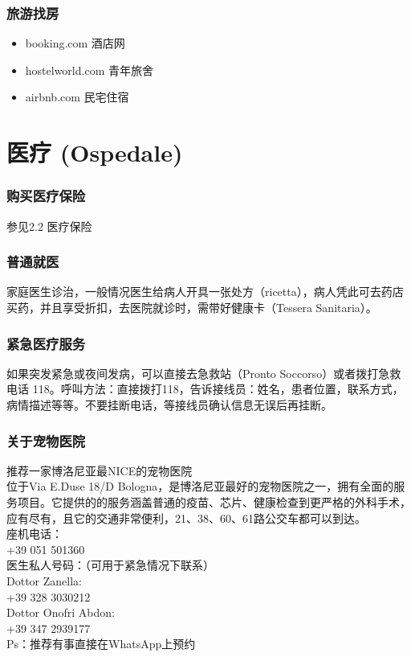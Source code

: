 \subsubsection{旅游找房}
\begin{itemize}
\item booking.com 酒店网
\item hostelworld.com 青年旅舍
\item airbnb.com 民宅住宿
\end{itemize} 


\section{医疗 (Ospedale)}


\subsubsection{购买医疗保险}
参见2.2 医疗保险 

\subsubsection{普通就医}
家庭医生诊治，一般情况医生给病人开具一张处方（ricetta），病人凭此可去药店买药，并且享受折扣，去医院就诊时，需带好健康卡（Tessera Sanitaria）。
\subsubsection{紧急医疗服务}

如果突发紧急或夜间发病，可以直接去急救站（Pronto Soccorso）或者拨打急救电话 118。呼叫方法：直接拨打118，告诉接线员：姓名，患者位置，联系方式，病情描述等等。不要挂断电话，等接线员确认信息无误后再挂断。
\subsubsection{关于宠物医院}
推荐一家博洛尼亚最NICE的宠物医院\\
位于Via E.Duse 18/D Bologna，是博洛尼亚最好的宠物医院之一，拥有全面的服务项目。它提供的的服务涵盖普通的疫苗、芯片、健康检查到更严格的外科手术，应有尽有，且它的交通非常便利，21、38、60、61路公交车都可以到达。\\
座机电话：\\
+39 051 501360\\
医生私人号码：（可用于紧急情况下联系）\\
Dottor Zanella:\\
+39 328 3030212\\
Dottor Onofri Abdon:\\
+39 347 2939177\\
Ps：推荐有事直接在WhatsApp上预约\\

